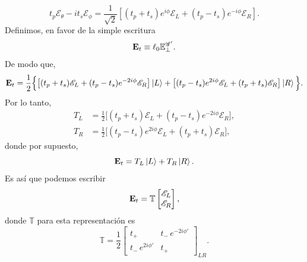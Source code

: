 \begin{equation}
t_p\mathscr E_\theta-i t_s\mathscr E_\phi
=
\frac{1}{\sqrt2}
\left[
(t_p+t_s)e^{i\phi}\mathscr E_L
+
(t_p-t_s)e^{-i\phi}\mathscr E_R
\right].
\end{equation}
Definimos, en favor de la simple escritura
\begin{equation}
  \vb E_t
  \equiv
  \ell_0 \mathbb E^{\mathscr G'}_\perp.
\end{equation}
De modo que,
\begin{equation}
\vb E_t
=
\frac{1}{2}
\Big\{
\big[(t_p+t_s)\mathscr E_L+(t_p-t_s)e^{-2i\phi}\mathscr E_R\big]\ket L
+
\big[(t_p-t_s)e^{2i\phi}\mathscr E_L+(t_p+t_s)\mathscr E_R\big]\ket R
\Big\}.
\label{eq:T_perp_circular_basis}
\end{equation}
Por lo tanto,
\begin{equation}
\begin{aligned}
T_L
&=
\frac{1}{2}
\big[
(t_p+t_s)\mathscr E_L
+
(t_p-t_s)e^{-2i\phi}\mathscr E_R
\big],
\\
T_R
&=
\frac{1}{2}
\big[
(t_p-t_s)e^{2i\phi}\mathscr E_L
+
(t_p+t_s)\mathscr E_R
\big],
\end{aligned}
\label{eq:TL_TR_circular}
\end{equation}
donde por supuesto,
\begin{equation}
  \vb E_t
  =
  T_L\ket L
  +
  T_R\ket R.
\end{equation}
Es así que podemos escribir
\begin{equation}
  \vb E_t = \mathbb T \begin{bmatrix}
                      \mathscr E_L \\ \mathscr E_R
                    \end{bmatrix},
\end{equation}
donde $\mathbb{T}$ para esta representación es
\begin{equation}
\mathbb T
=
\frac{1}{2}
\begin{bmatrix}
t_+
&
t_-\,e^{-2i\phi'}
\\
t_-\,e^{2i\phi'}
&
t_+
\end{bmatrix}_{LR}.
\label{eq:M_in_circular_basis}
\end{equation}

